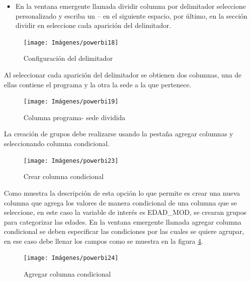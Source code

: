\documentclass[
]{book}
\providecommand{\tightlist}{%
  \setlength{\itemsep}{0pt}\setlength{\parskip}{0pt}}
\begin{document}
\begin{itemize}
\tightlist
\item
  En la ventana emergente llamada dividir columna por delimitador seleccione personalizado y escriba un -- en el siguiente espacio, por último, en la sección dividir en seleccione cada aparición del delimitador.
\end{itemize}

\begin{figure}

{\centering \texttt{[image: Imágenes/powerbi18]} 

}

\caption{Configuración del delimitador}\label{fig:configuraciondeldelimitador-fig}
\end{figure}

Al seleccionar cada aparición del delimitador se obtienen dos columnas, una de ellas contiene el programa y la otra la sede a la que pertenece.

\begin{figure}

{\centering \texttt{[image: Imágenes/powerbi19]} 

}

\caption{Columna programa- sede dividida}\label{fig:columnadivididacondelimitador-fig}
\end{figure}

La creación de grupos debe realizarse usando la pestaña agregar columnas y seleccionando columna condicional.

\begin{figure}

{\centering \texttt{[image: Imágenes/powerbi23]} 

}

\caption{Crear columna condicional}\label{fig:columnacondicional-fig}
\end{figure}

Como muestra la descripción de esta opción lo que permite es crear una nueva columna que agrega los valores de manera condicional de una columna que se seleccione, en este caso la variable de interés es EDAD\_MOD, se crearan grupos para categorizar las edades. En la ventana emergente llamada agregar columna condicional se deben especificar las condiciones por las cuales se quiere agrupar, en ese caso debe llenar los campos como se muestra en la figura \ref{fig:agregarcolumnacondicional-fig}.

\begin{figure}

{\centering \texttt{[image: Imágenes/powerbi24]} 

}

\caption{Agregar columna condicional}\label{fig:agregarcolumnacondicional-fig}
\end{figure}
\end{document}
